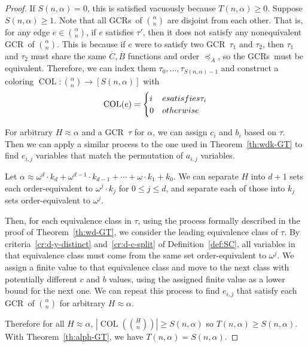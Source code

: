 \documentclass[11pt]{article}
\newcommand{\om}{\omega}
\newcommand{\oequiv}{\approx}
\newcommand{\COL}{\operatorname{COL}}
\newcommand{\gencrulenospace}{GCR}
\newcommand{\gencrule}{\gencrulenospace~}
\newcommand{\gencrules}{\gencrulenospace s~}
\newcommand{\xleq}{\preceq_{\overline{A}}}
\newcommand{\assny}{\overline{B}}
\newcommand{\assnc}{\overline{C}}
\newcommand{\numpoints}{n}
\newcommand{\inumpoints}{i}
\newcommand{\idegr}{j}
\newcommand{\commonconst}{a}
\newcommand{\rareconst}{b}
\theoremstyle{plain}
\theoremstyle{definition}
\begin{document}
\begin{proof}
If $S(\numpoints, \alpha) = 0$, this is satisfied vacuously because $T(\numpoints, \alpha) \geq 0$. Suppose $S(\numpoints,\alpha) \geq 1$.
Note that all \gencrules of $\binom{\alpha}{\numpoints}$ are disjoint from each other. That is, for any edge $e \in \binom{\alpha}{\numpoints}$, if $e$ satisfies $\tau'$, then it does not satisfy any nonequivalent \gencrule of $\binom{\alpha}{\numpoints}$. This is because if $e$ were to satisfy two \gencrule $\tau_1$ and $\tau_2$, then $\tau_1$ and $\tau_2$ must share the same $\assnc, \assny$ functions and order $\xleq$, so the \gencrules must be equivalent. Therefore, we can index them $\tau_0, \ldots, \tau_{S(\numpoints, \alpha)-1}$ and construct a coloring $\COL \colon \binom{\alpha}{\numpoints} \to [S(\numpoints, \alpha)]$ with \begin{align*}
    \COL(e) = \begin{cases}
    i & e \textnormal{ satisfies } \tau_i\\
    0 & \textnormal{otherwise}
    \end{cases}
\end{align*}

For arbitrary $H \oequiv \alpha$ and a \gencrule $\tau$ for $\alpha$, we can assign $c_{\inumpoints}$ and $\rareconst_{\inumpoints}$ based on $\tau$. Then we can apply a similar process to the one used in Theorem~\ref{th:wdk-GT} to find $e_{\inumpoints,\idegr}$ variables that match the permutation of $\commonconst_{\inumpoints,\idegr}$ variables.

Let $\alpha \oequiv \om^d \cdot k_d + \om^{d-1} \cdot k_{d-1} + \cdots + \om \cdot k_1 + k_0$.
We can separate $H$ into $d+1$ sets each order-equivalent to $\om^{\idegr} \cdot k_{\idegr}$ for $0 \leq \idegr \leq d$, and separate each of those into $k_{\idegr}$ sets order-equivalent to $\om^{\idegr}$.

Then, for each equivalence class in $\tau$, using the process formally described in the proof of Theorem~\ref{th:wd-GT},
we consider the leading equivalence class of $\tau$. By criteria~\ref{cr:d-y-distinct} and~\ref{cr:d-c-split}
of Definition~\ref{def:SC}, all variables in that equivalence class 
must come from the same set order-equivalent to $\om^{\idegr}$. We assign a finite value to 
that equivalence class and move to the next class with potentially different 
$c$ and $\rareconst$ values, using the assigned finite value as a lower bound for the next one. We can repeat this process to find $e_{\inumpoints ,\idegr}$ that satisfy each \gencrule of $\binom{\alpha}{\numpoints}$ for arbitrary $H \oequiv \alpha$.

Therefore for all 
$H \oequiv \alpha$,
$\left|\COL\left(\binom{H}{\numpoints}\right)\right|\geq S(\numpoints,\alpha)$ so $T(\numpoints,\alpha) \geq S\left(\numpoints, \alpha\right)$.
With Theorem~\ref{th:alph-GT}, we have
$T(\numpoints,\alpha) = S\left(\numpoints, \alpha\right)$.
\end{proof}
\end{document}
